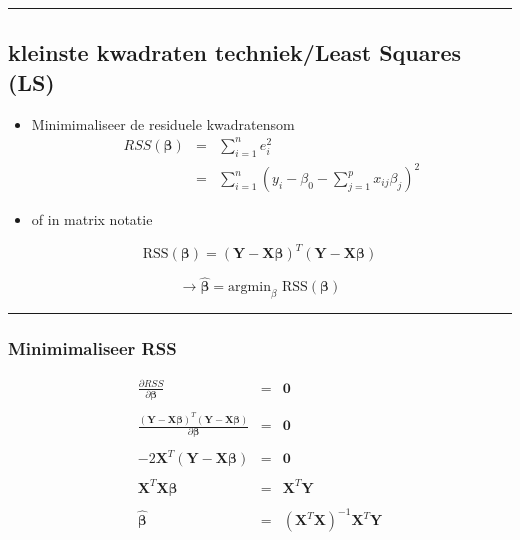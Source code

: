 \documentclass[
]{article}
\begin{document}
\begin{center}\rule{0.5\linewidth}{0.5pt}\end{center}

\hypertarget{kleinste-kwadraten-techniekleast-squares-ls}{%
\subsection{kleinste kwadraten techniek/Least Squares
(LS)}\label{kleinste-kwadraten-techniekleast-squares-ls}}

\begin{itemize}
\item
  Minimimaliseer de residuele kwadratensom \begin{eqnarray*}
  RSS(\boldsymbol{\beta})&=&\sum\limits_{i=1}^n e^2_i\\
  &=&\sum\limits_{i=1}^n \left(y_i-\beta_0-\sum\limits_{j=1}^p x_{ij}\beta_j\right)^2
  \end{eqnarray*}
\item
  of in matrix notatie
\end{itemize}

\[
\text{RSS}(\boldsymbol{\beta})=(\mathbf{Y}-\mathbf{X\beta})^T(\mathbf{Y}-\mathbf{X\beta})
\]

\[\rightarrow \hat{\boldsymbol{\beta}}=\text{argmin}_\beta \text{ RSS}(\boldsymbol{\beta})\]

\begin{center}\rule{0.5\linewidth}{0.5pt}\end{center}

\hypertarget{minimimaliseer-rss}{%
\subsubsection{Minimimaliseer RSS}\label{minimimaliseer-rss}}

\[
\begin{array}{ccc}
\frac{\partial RSS}{\partial \boldsymbol{\beta}}&=&\mathbf{0}\\\\
\frac{(\mathbf{Y}-\mathbf{X\beta})^T(\mathbf{Y}-\mathbf{X}\boldsymbol{\beta})}{\partial \boldsymbol{\beta}}&=&\mathbf{0}\\\\
-2\mathbf{X}^T(\mathbf{Y}-\mathbf{X}\boldsymbol{\beta})&=&\mathbf{0}\\\\
\mathbf{X}^T\mathbf{X\beta}&=&\mathbf{X}^T\mathbf{Y}\\\\
\hat{\boldsymbol{\beta}}&=&(\mathbf{X}^T\mathbf{X})^{-1}\mathbf{X}^T\mathbf{Y}
\end{array}
\]
\end{document}
